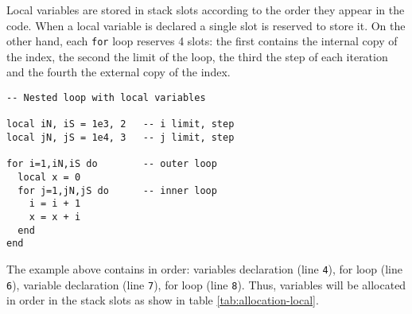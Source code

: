 \begin{comment}
\subsection{Nested loop}

\end{comment} %

Local variables are stored in stack slots according to the order they appear in the code. When a local variable is declared a single slot is reserved to store it. On the other hand, each \texttt{for} loop reserves 4 slots: the first contains the internal copy of the index, the second the limit of the loop, the third the step of each iteration and the fourth the external copy of the index. 
\begin{mdframed}[style=LuaStyleFrame]
\begin{lstlisting}[style=LuaStyle]
-- Nested loop with local variables

local iN, iS = 1e3, 2   -- i limit, step
local jN, jS = 1e4, 3   -- j limit, step

for i=1,iN,iS do        -- outer loop
  local x = 0
  for j=1,jN,jS do      -- inner loop
    i = i + 1
    x = x + i
  end
end
\end{lstlisting}
\end{mdframed}

\noindent
The example above contains in order: variables declaration (line \texttt{4}), for loop (line \texttt{6}), variable declaration (line \texttt{7}), for loop (line \texttt{8}). Thus, variables will be allocated in order in the stack slots as show in table \ref{tab:allocation-local}.

